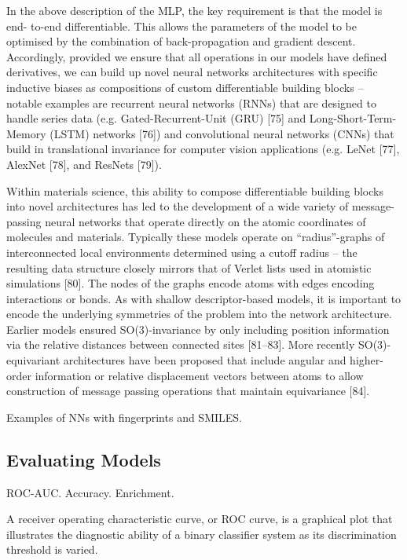 In the above description of the MLP, the key requirement is that the model is end- to-end differentiable. This allows the parameters of the model to be optimised by the combination of back-propagation and gradient descent. Accordingly, provided we ensure that all operations in our models have defined derivatives, we can build up novel neural networks architectures with specific inductive biases as compositions of custom differentiable building blocks – notable examples are recurrent neural networks (RNNs) that are designed to handle series data (e.g. Gated-Recurrent-Unit (GRU) [75] and Long-Short-Term-Memory (LSTM) networks [76]) and convolutional neural networks
(CNNs) that build in translational invariance for computer vision applications (e.g. LeNet [77], AlexNet [78], and ResNets [79]).

Within materials science, this ability to compose differentiable building blocks into novel architectures has led to the development of a wide variety of message-passing neural networks that operate directly on the atomic coordinates of molecules and materials. Typically these models operate on “radius”-graphs of interconnected local environments determined using a cutoff radius – the resulting data structure closely mirrors that of Verlet lists used in atomistic simulations [80]. The nodes of the graphs encode atoms with edges encoding interactions or bonds. As with shallow descriptor-based models, it is important to encode the underlying symmetries of the problem into the network architecture. Earlier models ensured SO(3)-invariance by only including position information via the relative distances between connected sites [81–83]. More recently SO(3)-equivariant architectures have been proposed that include angular and higher-order information or relative displacement vectors between atoms to allow construction of message passing operations that maintain equivariance [84].

Examples of NNs with fingerprints and SMILES.

\subsection{Evaluating Models}

ROC-AUC. Accuracy. Enrichment.

A receiver operating characteristic curve, or ROC curve, is a graphical plot that illustrates the diagnostic ability of a binary classifier system as its discrimination threshold is varied.


